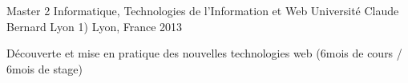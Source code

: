 

\begin{cventries}

  \cventry
    {Master 2 Informatique, Technologies de l'Information et Web} %
    {Université Claude Bernard Lyon 1)} %
    {Lyon, France} %
    {2013} %
    {
      \begin{cvitems} %
        \item {Découverte et mise en pratique des nouvelles technologies web (6mois de cours / 6mois de stage)}
      \end{cvitems}
    }

\end{cventries}
